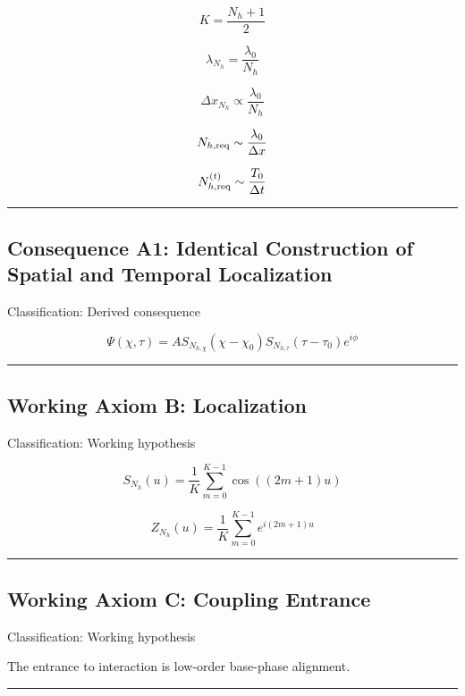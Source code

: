 \documentclass[
  a4paper,
]{article}
\begin{document}
\[
K=\frac{N_h+1}{2}
\]

\[
\lambda_{N_h}=\frac{\lambda_0}{N_h}
\]

\[
\Delta x_{N_h}\propto\frac{\lambda_0}{N_h}
\]

\[
N_{h,\rm req}\sim\frac{\lambda_0}{\Delta x}
\]

\[
N_{h,\rm req}^{(t)}\sim\frac{T_0}{\Delta t}
\]

\begin{center}\rule{0.5\linewidth}{0.5pt}\end{center}

\subsection{Consequence A1: Identical Construction of Spatial and
Temporal
Localization}\label{consequence-a1-identical-construction-of-spatial-and-temporal-localization}

Classification: Derived consequence

\[
\Psi(\chi,\tau)=A S_{N_{h,\chi}}(\chi-\chi_0)S_{N_{h,\tau}}(\tau-\tau_0)e^{i\phi}
\]

\begin{center}\rule{0.5\linewidth}{0.5pt}\end{center}

\subsection{Working Axiom B:
Localization}\label{working-axiom-b-localization}

Classification: Working hypothesis

\[
S_{N_h}(u)=\frac{1}{K}\sum_{m=0}^{K-1}\cos((2m+1)u)
\]

\[
Z_{N_h}(u)=\frac{1}{K}\sum_{m=0}^{K-1}e^{i(2m+1)u}
\]

\begin{center}\rule{0.5\linewidth}{0.5pt}\end{center}

\subsection{Working Axiom C: Coupling
Entrance}\label{working-axiom-c-coupling-entrance}

Classification: Working hypothesis

The entrance to interaction is low-order base-phase alignment.

\begin{center}\rule{0.5\linewidth}{0.5pt}\end{center}
\end{document}
